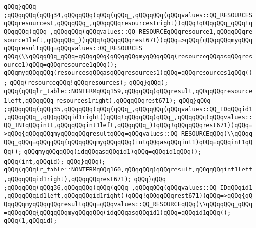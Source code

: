 \verb|qQQq}qQQq|\newline
\verb|;qQQqqQQq(qQQq34,qQQqqQQq(qQQq(qQQq_,qQQqqQQq(qQQqvalues::QQ_RESOURCESqQQqresources1,qQQqqQQq_,qQQqqQQqresources1right))qQQq!qQQqqQQq_qQQq!qQQqqQQq(qQQq_,qQQqqQQq(qQQqvalues::QQ_RESOURCEqQQqresource1,qQQqqQQqresource1left,qQQqqQQq_))qQQq!qQQqqQQqrest671))qQQq=>qQQq{qQQqqQQqmyqQQqqQQqresultqQQq=qQQqvalues::QQ_RESOURCES|\newline
\verb|qQQq(\\qQQqqQQq_qQQq=qQQqqQQq{qQQqqQQqmyqQQqqQQq(resourceqQQqasqQQqresource1)qQQq=qQQqresource1qQQq();|\newline
\verb|qQQqmyqQQqqQQq(resourcesqQQqasqQQqresources1)qQQq=qQQqresources1qQQq();|\newline
\verb|qQQq(resourceqQQq!qQQqresources);|\newline
\verb|qQQq}qQQq);|\newline
\verb|qQQq(qQQqlr_table::NONTERMqQQq159,qQQqqQQq(qQQqresult,qQQqqQQqresource1left,qQQqqQQq|\newline
\verb|resources1right),qQQqqQQqrest671);|\newline
\verb|qQQq}qQQq|\newline
\verb|;qQQqqQQq(qQQq35,qQQqqQQq(qQQq(qQQq_,qQQqqQQq(qQQqvalues::QQ_IDqQQqid1,qQQqqQQq_,qQQqqQQqid1right))qQQq!qQQqqQQq(qQQq_,qQQqqQQq(qQQqvalues::QQ_INTqQQqint1,qQQqqQQqint1left,qQQqqQQq_))qQQq!qQQqqQQqrest671))qQQq=>qQQq{qQQqqQQqmyqQQqqQQqresultqQQq=qQQqvalues::QQ_RESOURCEqQQq(\\qQQqqQQq_qQQq=qQQqqQQq{qQQqqQQqmyqQQqqQQq(intqQQqasqQQqint1)qQQq=qQQqint1qQQq();|\newline
\newline
\verb|qQQqmyqQQqqQQq(idqQQqasqQQqid1)qQQq=qQQqid1qQQq();|\newline
\verb|qQQq(int,qQQqid);|\newline
\verb|qQQq}qQQq);|\newline
\verb|qQQq(qQQqlr_table::NONTERMqQQq160,qQQqqQQq(qQQqresult,qQQqqQQqint1left,qQQqqQQqid1right),qQQqqQQqrest671);|\newline
\verb|qQQq}qQQq|\newline
\verb|;qQQqqQQq(qQQq36,qQQqqQQq(qQQq(qQQq_,qQQqqQQq(qQQqvalues::QQ_IDqQQqid1,qQQqqQQqid1left,qQQqqQQqid1right))qQQq!qQQqqQQqrest671))qQQq=>qQQq{qQQqqQQqmyqQQqqQQqresultqQQq=qQQqvalues::QQ_RESOURCEqQQq(\\qQQqqQQq_qQQq=qQQqqQQq{qQQqqQQqmyqQQqqQQq(idqQQqasqQQqid1)qQQq=qQQqid1qQQq();|\newline
\verb|qQQq(1,qQQqid);|\newline
